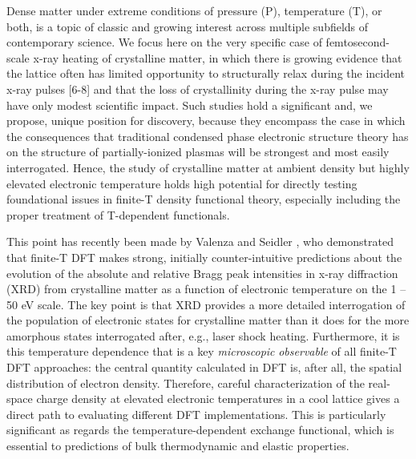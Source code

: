 Dense matter under extreme conditions of pressure (P), temperature (T),
or both, is a topic of classic and growing interest across multiple
subfields of contemporary science. \cite{drake2006high, krishnan1998structure, fortney2009frontiers, glenzer2009x, national2003high} We focus here on the very
specific case of femtosecond-scale x-ray heating of crystalline matter,
in which there is growing evidence that the lattice often has limited
opportunity to structurally relax during the incident x-ray pulses
{[}6-8{]} and that the loss of crystallinity during the x-ray pulse may
have only modest scientific impact. \cite{caleman2015ultrafast} Such studies hold a
significant and, we propose, unique position for discovery, because they
encompass the case in which the consequences that traditional condensed
phase electronic structure theory has on the structure of
partially-ionized plasmas will be strongest and most easily
interrogated. Hence, the study of crystalline matter at ambient density
but highly elevated electronic temperature holds high potential for
directly testing foundational issues in finite-T density functional
theory, especially including the proper treatment of T-dependent
functionals. \cite{karasiev2012generalized, karasiev2012comparison, valenza2016warm}

This point has recently been made by Valenza and Seidler \cite{valenza2016warm}, who
demonstrated that finite-T DFT makes strong, initially counter-intuitive
predictions about the evolution of the absolute and relative Bragg peak
intensities in x-ray diffraction (XRD) from crystalline matter as a
function of electronic temperature on the 1 -- 50 eV scale. The key
point is that XRD provides a more detailed interrogation of the
population of electronic states for crystalline matter than it does for
the more amorphous states interrogated after, e.g., laser shock heating.
Furthermore, it is this temperature dependence that is a key
\emph{microscopic} \emph{observable} of all finite-T DFT approaches: the
central quantity calculated in DFT is, after all, the spatial
distribution of electron density. Therefore, careful characterization of
the real-space charge density at elevated electronic temperatures in a
cool lattice gives a direct path to evaluating different DFT
implementations. This is particularly significant as regards the
temperature-dependent exchange functional, which is essential to
predictions of bulk thermodynamic and elastic properties. \cite{karasiev2012generalized, karasiev2012comparison, bredow2000effect}

